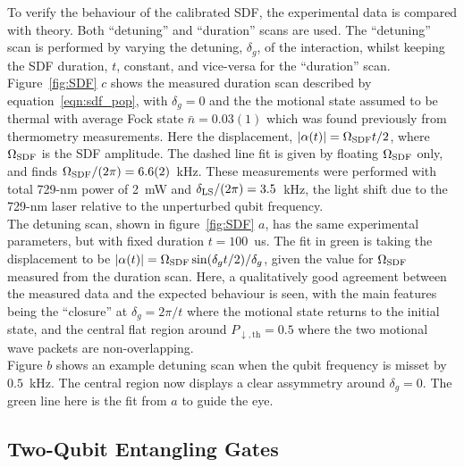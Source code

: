     To verify the behaviour of the calibrated SDF, the experimental data is compared with theory. Both
    ``detuning'' and ``duration'' scans are used. The ``detuning'' scan is performed by
    varying the detuning, $\delta_g$, of the interaction, whilst keeping the
    SDF duration, $t$, constant, and vice-versa for the ``duration'' scan. \\
    Figure~\ref{fig:SDF} $c$ shows the measured duration scan described by equation~\ref{eqn:sdf_pop}, with $\delta_g = 0$ and the the motional state assumed to be thermal with average Fock state $\bar{n}
    = 0.03(1)$ which was found previously from thermometry measurements.
    Here the displacement, $|\alpha(t)| = \Omega_{\rm SDF} t/2$, where $\Omega_{\rm SDF}$ is the
    SDF amplitude. The dashed line fit is given by floating $\Omega_{\rm SDF}$ only, and finds $\Omega_{\rm SDF}/(2\pi) = 6.6(2)$~\unit{kHz}.
    These measurements were performed with total 729-nm power of 2~mW and $\delta_{\rm LS}/(2\pi) = 3.5$~\unit{\kHz}, the light shift due to the 729-nm laser relative to the unperturbed qubit frequency. \\
    The detuning scan, shown in figure~\ref{fig:SDF} $a$, has the same experimental parameters, but with fixed duration $t=100$~\unit{us}. The fit in green is taking the 
    displacement to be $|\alpha(t)| = \Omega_{\rm SDF} \sin(\delta_g t/2)/\delta_g$, given the value for $\Omega_{\rm SDF}$ measured from the duration scan. Here,
    a qualitatively good agreement between the measured data and the
    expected behaviour is seen, with the main features being the ``closure''
    at $\delta_g = 2\pi/t$ where the motional state returns to the initial state,
    and the central flat region around $P_{\downarrow, \mathrm{th}} =0.5$ where
    the two motional wave packets are non-overlapping.\\
    Figure $b$ shows an example detuning scan when the qubit frequency is misset by $0.5$~\unit{\kHz}. The central region now displays a clear assymmetry around $\delta_g = 0$. The green line here is the fit from $a$ to guide the eye.


\subsection{Two-Qubit Entangling Gates}
\label{sec:Two-Qubit Entangling Gates}

